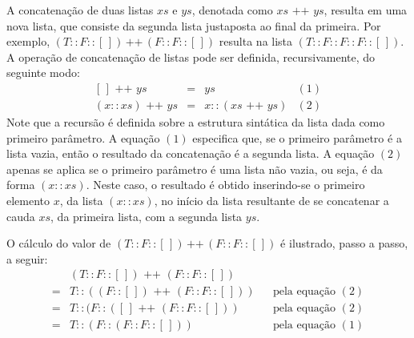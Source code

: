 \begin{Definition}\label{def:concat:lists}
A concatenação de duas listas $xs$ e $ys$, denotada como $xs\text{ ++ }ys$, resulta em uma nova lista,
que consiste da segunda lista justaposta ao final da primeira. Por exemplo,  $(T :: F :: [\,])\,\text{++}\,(F :: F :: [\,])$ resulta na lista $(T :: F :: F :: F :: [\,])$. A operação de concatenação de listas pode ser definida, recursivamente, do seguinte modo:
 \[
  \begin{array}{lclr}
    [\,] \text { ++ } ys & = & ys & (1)\\
    (x :: xs) \text{ ++ }  ys & = & x :: (xs\text{ ++ } ys) & (2)
  \end{array}
  \]
Note que a recursão é definida sobre a estrutura sint\'atica da lista dada como primeiro par\^ametro. A equa\c{c}\~ao $(1)$ especifica que, se o primeiro parâmetro é a lista vazia, ent\~ao o resultado da concatena\c{c}\~ao \'e a segunda lista. A equa\c{c}\~ao $(2)$ apenas se aplica se o primeiro parâmetro é uma lista não vazia, ou seja, é da forma $(x :: xs)$. Neste caso, o resultado \'e obtido inserindo-se o primeiro elemento $x$, da lista $(x :: xs)$, no in\'icio da lista resultante de se concatenar a cauda $xs$, da primeira lista, com a segunda lista $ys$.
\end{Definition}

\begin{Example}
O cálculo do valor de $(T :: F :: [\,])\,\text{++}\,(F :: F :: [\,])$ é ilustrado, passo a passo, a seguir:
\[
\begin{array}{llcl}
& (T :: F :: [\,]) \text{ ++ } (F :: F ::[\,])       & & \\
= & T :: ((F :: [\,]) \text{ ++ } (F :: F ::[\,])) &  & \text{pela equa\c{c}\~ao }(2)\\
= & T :: (F :: ([\,] \text{ ++ } (F :: F ::[\,]))  &  & \text{pela equa\c{c}\~ao }(2)\\
= & T :: (F :: (F :: F ::[\,]))                          &  & \text{pela equa\c{c}\~ao }(1)\\
\end{array}
\]
\end{Example}

